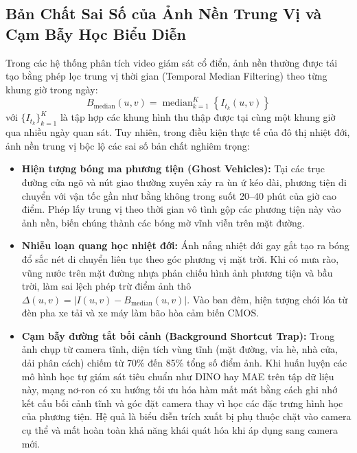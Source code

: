 \documentclass[11pt,a4paper]{article}
\begin{document}
\subsection{Bản Chất Sai Số của Ảnh Nền Trung Vị và Cạm Bẫy Học Biểu Diễn}
Trong các hệ thống phân tích video giám sát cổ điển, ảnh nền thường được tái tạo bằng phép lọc trung vị thời gian (Temporal Median Filtering) theo từng khung giờ trong ngày:
\begin{equation}
    B_{\text{median}}(u, v) = \operatorname{median}_{k=1}^K \left\{ I_{t_k}(u, v) \right\}
\end{equation}
với $\{I_{t_k}\}_{k=1}^K$ là tập hợp các khung hình thu thập được tại cùng một khung giờ qua nhiều ngày quan sát. Tuy nhiên, trong điều kiện thực tế của đô thị nhiệt đới, ảnh nền trung vị bộc lộ các sai số bản chất nghiêm trọng:
\begin{itemize}
    \item \textbf{Hiện tượng bóng ma phương tiện (Ghost Vehicles):} Tại các trục đường cửa ngõ và nút giao thường xuyên xảy ra ùn ứ kéo dài, phương tiện di chuyển với vận tốc gần như bằng không trong suốt 20--40 phút của giờ cao điểm. Phép lấy trung vị theo thời gian vô tình gộp các phương tiện này vào ảnh nền, biến chúng thành các bóng mờ vĩnh viễn trên mặt đường.
    \item \textbf{Nhiễu loạn quang học nhiệt đới:} Ánh nắng nhiệt đới gay gắt tạo ra bóng đổ sắc nét di chuyển liên tục theo góc phương vị mặt trời. Khi có mưa rào, vũng nước trên mặt đường nhựa phản chiếu hình ảnh phương tiện và bầu trời, làm sai lệch phép trừ điểm ảnh thô $\Delta(u, v) = |I(u, v) - B_{\text{median}}(u, v)|$. Vào ban đêm, hiện tượng chói lóa từ đèn pha xe tải và xe máy làm bão hòa cảm biến CMOS.
    \item \textbf{Cạm bẫy đường tắt bối cảnh (Background Shortcut Trap):} Trong ảnh chụp từ camera tĩnh, diện tích vùng tĩnh (mặt đường, vỉa hè, nhà cửa, dải phân cách) chiếm từ 70\% đến 85\% tổng số điểm ảnh. Khi huấn luyện các mô hình học tự giám sát tiêu chuẩn như DINO hay MAE trên tập dữ liệu này, mạng nơ-ron có xu hướng tối ưu hóa hàm mất mát bằng cách ghi nhớ kết cấu bối cảnh tĩnh và góc đặt camera thay vì học các đặc trưng hình học của phương tiện. Hệ quả là biểu diễn trích xuất bị phụ thuộc chặt vào camera cụ thể và mất hoàn toàn khả năng khái quát hóa khi áp dụng sang camera mới.
\end{itemize}
\end{document}
